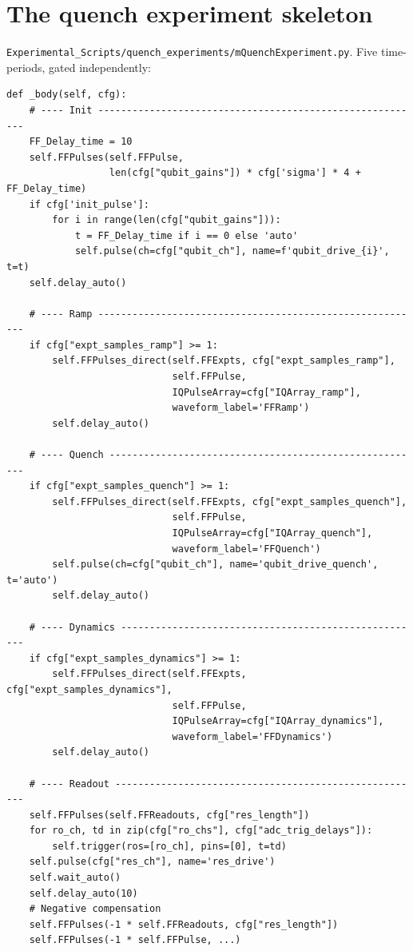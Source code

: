 \documentclass[11pt,letterpaper]{article}
\begin{document}
\section{The quench experiment skeleton}
\texttt{Experimental\_Scripts/quench\_experiments/mQuenchExperiment.py}. Five time-periods, gated independently:
\begin{lstlisting}
def _body(self, cfg):
    # ---- Init ---------------------------------------------------------
    FF_Delay_time = 10
    self.FFPulses(self.FFPulse,
                  len(cfg["qubit_gains"]) * cfg['sigma'] * 4 + FF_Delay_time)
    if cfg['init_pulse']:
        for i in range(len(cfg["qubit_gains"])):
            t = FF_Delay_time if i == 0 else 'auto'
            self.pulse(ch=cfg["qubit_ch"], name=f'qubit_drive_{i}', t=t)
    self.delay_auto()

    # ---- Ramp ---------------------------------------------------------
    if cfg["expt_samples_ramp"] >= 1:
        self.FFPulses_direct(self.FFExpts, cfg["expt_samples_ramp"],
                             self.FFPulse,
                             IQPulseArray=cfg["IQArray_ramp"],
                             waveform_label='FFRamp')
        self.delay_auto()

    # ---- Quench -------------------------------------------------------
    if cfg["expt_samples_quench"] >= 1:
        self.FFPulses_direct(self.FFExpts, cfg["expt_samples_quench"],
                             self.FFPulse,
                             IQPulseArray=cfg["IQArray_quench"],
                             waveform_label='FFQuench')
        self.pulse(ch=cfg["qubit_ch"], name='qubit_drive_quench', t='auto')
        self.delay_auto()

    # ---- Dynamics -----------------------------------------------------
    if cfg["expt_samples_dynamics"] >= 1:
        self.FFPulses_direct(self.FFExpts, cfg["expt_samples_dynamics"],
                             self.FFPulse,
                             IQPulseArray=cfg["IQArray_dynamics"],
                             waveform_label='FFDynamics')
        self.delay_auto()

    # ---- Readout ------------------------------------------------------
    self.FFPulses(self.FFReadouts, cfg["res_length"])
    for ro_ch, td in zip(cfg["ro_chs"], cfg["adc_trig_delays"]):
        self.trigger(ros=[ro_ch], pins=[0], t=td)
    self.pulse(cfg["res_ch"], name='res_drive')
    self.wait_auto()
    self.delay_auto(10)
    # Negative compensation
    self.FFPulses(-1 * self.FFReadouts, cfg["res_length"])
    self.FFPulses(-1 * self.FFPulse, ...)
\end{lstlisting}
\end{document}
